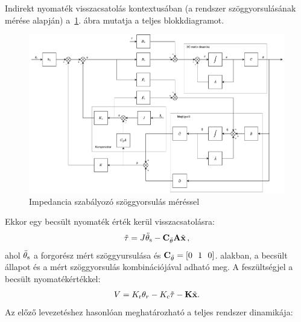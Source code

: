Indirekt nyomaték visszacsatolás kontextusában (a rendszer szöggyorsulásának mérése alapján) 
a~\ref{fig:block_diagram_indirect_compensation}. ábra mutatja a teljes blokkdiagramot.
\begin{figure}[ht]
    \begin{center}
    \includegraphics[width=\textwidth]{images/compensated_position_controller_angular_acceleration.pdf}
    \caption{Impedancia szabályozó szöggyorsulás méréssel}\label{fig:block_diagram_indirect_compensation}
    \end{center}
\end{figure}
Ekkor egy becsült nyomaték érték kerül visszacsatolásra:
\begin{align}
    \tilde \tau = J \ddot \theta_{\mathrm{s}} - \mathbf{C}_{\ddot\theta} \mathbf{A} \tilde{\mathbf{x}}\,,
\end{align}
ahol \(\ddot \theta_{\mathrm{s}}\) a forgorész mért szöggyursulása és \(\mathbf{C}_{\ddot\theta} = [0~~1~~0]\).
alakban, a becsült állapot és a mért szöggyorsulás kombinációjával adható meg.
A feszültségjel a becsült nyomatékértékkel:
\begin{align}
    V = K_{\mathrm{r}} \theta_r - K_c \tilde \tau - \mathbf{K} \tilde{\mathbf{x}}.
\end{align}
Az előző levezetéshez hasonlóan meghatározható a teljes rendszer dinamikája:
